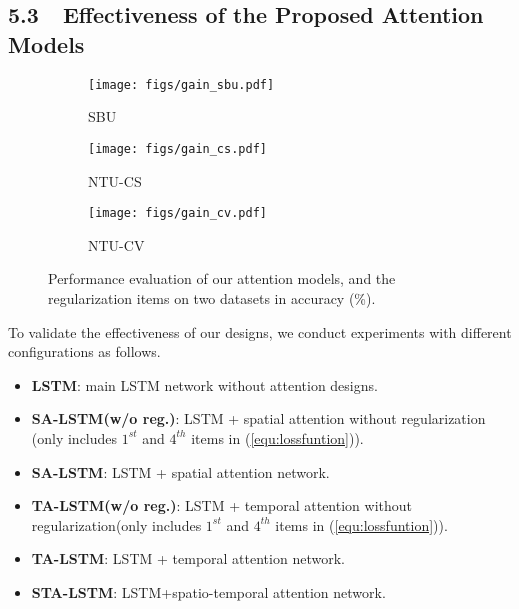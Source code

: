 \documentclass[letterpaper]{article}
\begin{document}
\subsection{5.3~~Effectiveness of the Proposed Attention Models}
\begin{figure}[th]
	\vspace{-3mm}
	\centering
	\begin{subfigure}[t]{0.15\textwidth}
		\centering\texttt{[image: figs/gain\_sbu.pdf]}
		\vspace{-4mm}
		\caption{SBU}
		\label{fig:skeleton1}
		
	\end{subfigure}
	\begin{subfigure}[t]{0.15\textwidth}
		\centering\texttt{[image: figs/gain\_cs.pdf]}
\vspace{-4mm}
		\caption{NTU-CS}
		\label{fig:skeleton2}
		
	\end{subfigure}
	\begin{subfigure}[t]{0.15\textwidth}
		\centering\texttt{[image: figs/gain\_cv.pdf]}
		\vspace{-4mm}
		\caption{NTU-CV}
		\label{fig:skeleton2}
	\end{subfigure}
	\vspace{-3mm}
	\caption[]{Performance evaluation of our attention models, and the regularization items on two datasets in accuracy (\%).}\label{fig:in-comp}
\vspace{-3.5mm}	
\end{figure}
\vspace{1.8mm}
To validate the effectiveness of our designs, we conduct experiments with different configurations as follows.
\vspace{-1mm}
\begin{itemize}
\setlength{\itemsep}{0pt}
\setlength{\parskip}{0pt}
	\item \textbf{LSTM}: main LSTM network without attention designs.
	\item \textbf{SA-LSTM(w/o reg.)}: LSTM  + spatial attention without regularization (only includes $1^{st}$ and $4^{th}$ items in (\ref{equ:lossfuntion})).
	\item \textbf{SA-LSTM}: LSTM  + spatial attention network.
	\item \textbf{TA-LSTM(w/o reg.)}: LSTM + temporal attention without regularization(only includes $1^{st}$ and $4^{th}$ items in (\ref{equ:lossfuntion})).
	\item \textbf{TA-LSTM}: LSTM + temporal attention network.
	\item \textbf{STA-LSTM}: LSTM+spatio-temporal attention network.
\end{itemize}
\end{document}
